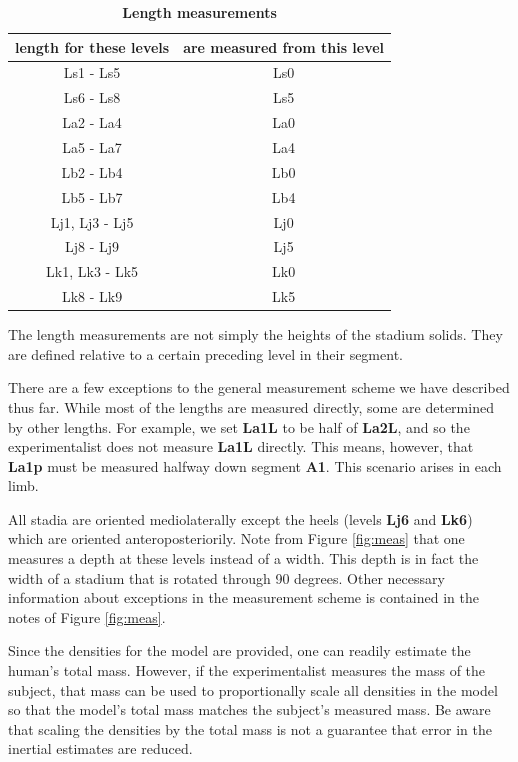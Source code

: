\documentclass[10pt,a4paper,twocolumn]{article}
\begin{document}
\begin{table}
  \centering
  \caption{
    \bf{Length measurements}
  }
  \begin{tabular}{cc}
    \hline
    \textbf{length for these levels} & \textbf{are measured from this level}\\
    \hline
    Ls1 - Ls5 & Ls0 \\
    Ls6 - Ls8 & Ls5 \\
    La2 - La4 & La0 \\
    La5 - La7 & La4 \\
    Lb2 - Lb4 & Lb0 \\
    Lb5 - Lb7 & Lb4 \\
    Lj1, Lj3 - Lj5 & Lj0 \\
    Lj8 - Lj9 & Lj5  \\
    Lk1, Lk3 - Lk5 & Lk0 \\
    Lk8 - Lk9 & Lk5  \\
  \end{tabular}
  \begin{flushleft}
    The length measurements are not simply the heights of the stadium solids.
    They are defined relative to a certain preceding level in their segment.
  \end{flushleft}
  \label{tab:length}
\end{table}

There are a few exceptions to the general measurement scheme we have described
thus far. While most of the lengths are  measured directly, some are determined
by other lengths. For example, we set \textbf{La1L} to be half of
\textbf{La2L}, and so the experimentalist does not measure \textbf{La1L}
directly. This means, however, that \textbf{La1p} must be measured halfway down
segment \textbf{A1}. This scenario arises in each limb.

All stadia are oriented mediolaterally except the heels (levels \textbf{Lj6}
and \textbf{Lk6}) which are oriented anteroposteriorily.  Note from Figure
\ref{fig:meas} that one measures a depth at these levels instead of a width.
This depth is in fact the width of a stadium that is rotated through 90
degrees. Other necessary information about exceptions in the measurement scheme
is contained in the notes of Figure \ref{fig:meas}.

Since the densities for the model are provided, one can readily estimate the
human's total mass. However, if the experimentalist measures the mass of the
subject, that mass can be used to proportionally scale all densities in the
model so that the model's total mass matches the subject's measured mass. Be
aware that scaling the densities by the total mass is not a guarantee that
error in the inertial estimates are reduced.
\end{document}
